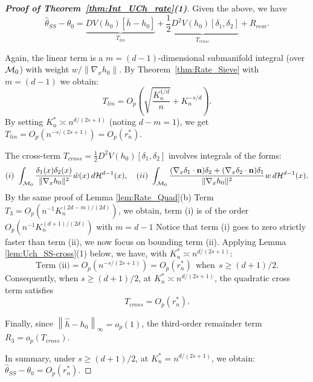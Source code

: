 \documentclass[12pt,american]{article}
\newcommand{\cH}{\mathcal{H}}
\theoremstyle{definition}
\theoremstyle{plain}
\theoremstyle{definition}
\theoremstyle{plain}
\theoremstyle{plain}
\theoremstyle{plain}
\theoremstyle{plain}
\theoremstyle{plain}
\newcommand{\norm}[1]{\left\| #1 \right\|}
\begin{document}
\begin{proof}[\textbf{Proof of Theorem~\ref{thm:Int_UCh_rate}(1)}]
Given the above, we have
\begin{equation}
\hat{\theta}_{SS} - \theta_0 = \underbrace{DV(h_0)[\bar{h} - h_0]}_{T_{lin}} + \underbrace{\frac{1}{2}D^2V(h_0)[\delta_1, \delta_2]}_{T_{cross}} + R_{rem}. \label{eq:V_SS_decomp}
\end{equation}

Again, the linear term is a $m=(d-1)$-dimensional submanifold integral (over $\mathcal{M}_0$) with weight $w/\|\nabla_x h_0\|$. By Theorem~\ref{thm:Rate_Sieve} with $m = (d-1)$ we obtain:
\[
T_{lin} = O_p\left(\sqrt{\frac{K_n^{1/d}}{n}} + K_n^{-s/d}\right).
\]
By setting $K^*_n \asymp n^{d/(2s+1)}$ (noting $d - m = 1$), we get $T_{lin} = O_p(n^{-s/(2s+1)}) = O_p(r_n^*)$.

The cross-term $T_{cross}=\frac{1}{2}D^2V(h_0)[\delta_1, \delta_2]$ involves integrals of the forms:
\[
(i)~\int_{\cM_0} \frac{\delta_1(x)\delta_2(x)}{\|\nabla_x h_0\|^2} \tilde{w}(x)\,d\cH^{d-1}(x), \quad (ii)~\int_{\cM_0} \frac{(\nabla_x\delta_1 \cdot \mathbf{n})\delta_2 + (\nabla_x\delta_2 \cdot \mathbf{n})\delta_1}{\|\nabla_x h_0\|^2} w\,d\cH^{d-1}(x).
\]
By the same proof of Lemma \ref{lem:Rate_Quad}(b) Term $T_3 = O_p\left(n^{-1}K_n^{(2d-m)/(2d)}\right)$, we obtain, term (i) is of the order $O_p\left(n^{-1}K_n^{(d+1)/(2d)}\right)$ with $m=d-1$
Notice that term (i) goes to zero strictly faster than term (ii), we now focus on bounding term (ii).
Applying Lemma \ref{lem:Uch_SS-cross}(1) below, we have, with $K^*_n \asymp n^{d/(2s+1)}$:
\[
\text{Term (ii)} =O_p(n^{-s/(2s+1)})=O_p(r^*_n)~~\text{when}~~ s\geq (d+1)/2.
\]
Consequently, when $s\geq (d+1)/2$, at $K^*_n \asymp n^{d/(2s+1)}$, the quadratic cross term satisfies
$$T_{cross} = O_p(r_n^*).$$

Finally, since $\norm{\hat{h}-h_0}_{\infty}=o_p(1)$, the third-order remainder term $R_3=o_p(T_{cross})$.

In summary, under $s \ge (d+1)/2$, at $K^*_n = n^{d/(2s+1)}$, we obtain: $\hat{\theta}_{SS} - \theta_0 = O_p(r_n^*).$
\end{proof}
~
\end{document}

